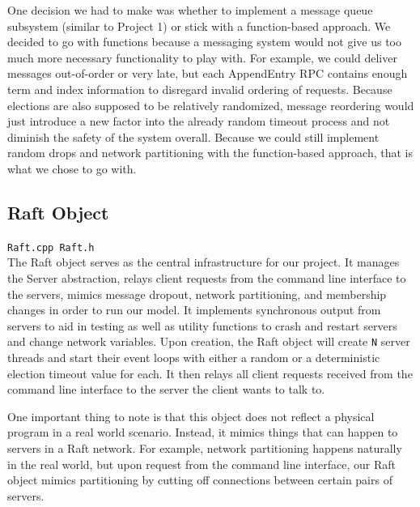 \documentclass[letterpaper,twocolumn,10pt]{article}
\begin{document}
One decision we had to make was whether to implement a message queue subsystem (similar to Project 1) or stick with a function-based approach. We decided to go with functions because a messaging system would not give us too much more necessary functionality to play with. For example, we could deliver messages out-of-order or very late, but each AppendEntry RPC contains enough term and index information to disregard invalid ordering of requests. Because elections are also supposed to be relatively randomized, message reordering would just introduce a new factor into the already random timeout process and not diminish the safety of the system overall. Because we could still implement random drops and network partitioning with the function-based approach, that is what we chose to go with.

\subsection{Raft Object}
\texttt{Raft.cpp Raft.h} \\
The Raft object serves as the central infrastructure for our project. It manages the Server abstraction, relays client requests from the command line interface to the servers, mimics message dropout, network partitioning, and membership changes in order to run our model. It implements synchronous output from servers to aid in testing as well as utility functions to crash and restart servers and change network variables. Upon creation, the Raft object will create \texttt{N} server threads and start their event loops with either a random or a deterministic election timeout value for each. It then relays all client requests received from the command line interface to the server the client wants to talk to. 

One important thing to note is that this object does not reflect a physical program in a real world scenario. Instead, it mimics things that can happen to servers in a Raft network. For example, network partitioning happens naturally in the real world, but upon request from the command line interface, our Raft object mimics partitioning by cutting off connections between certain pairs of servers.

\end{document}
